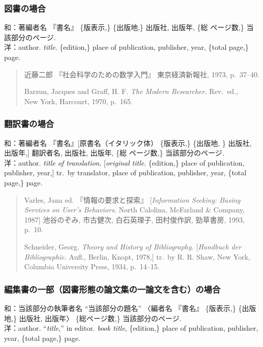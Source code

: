 \documentclass[b5paper,10pt,twocolumn,tombow]{jarticle}
\begin{document}
\subsubsection{図書の場合}
\noindent{}和：著編者名 『書名』 \{版表示,\} \{出版地,\} 出版社, 出版年, \{総
\bigskip
ページ数,\} 当該部分のページ.\\
洋：author. \textit{title}. \{edition,\} place of publication,
publisher, year, \{total page,\} page.
\begin{quote}
  近藤二郎 『社会科学のための数学入門』 東京経済新報社, 1973,
  p.~37--40.

  Barzun, Jacques and Graff, H. F. \textit{The Modern Researcher.}
  Rev.\ ed., \\New York, Harcourt, 1970, p.~165.
\end{quote}


\subsubsection{翻訳書の場合}
\noindent{}和：著編者名 『書名』[原書名（イタリック体） \{版表示,\}
\{出版地, \} 出版社, 出版年,] 翻訳者名, 出版社, 出版年, \{総
\bigskip
ページ数,\} 当該部分のページ.\\
洋：author. \textit{title of translation}. [\textit{original
title}. \{edition,\} place of publication, publisher, year,] tr.\ by
translator, place of publication, publisher, year, \{total page,\} page.

\begin{quote}
  Varles, Jana ed. 『情報の要求と探索』 [\textit{Information Seeking:
  Basing Services on User's Behaviors.} North Calolina,
  McFarland \& Company, 1987] 池谷のぞみ, 市古健次, 白石英理子, 田村俊作訳,
  勁草書房, 1993, p.~10.

  Schneider, Georg. \textit{Theory and History of Bibliography.}
  [\textit{Handbuch der Bibliographie.} Aufl., Berlin, Knopt, 1978,]
  tr.\ by R. R. Shaw, New York, Columbia University Press, 1934, p.~14--15.
\end{quote}

\subsubsection{編集書の一部（図書形態の論文集の一論文を含む）の場合}
\noindent{}和：当該部分の執筆者名 ``当該部分の題名'' 〈編者名 『書名』 \{版表示,\} \{出版地,\} 出版社, 出版年〉 \{総ページ数,\} 当該部分のページ. \bigskip \\
洋：author. ``\textit{title},'' in editor. \textit{book title}, \{edition,\} place of publication,
publisher, year, \{total page,\} page.
\end{document}
